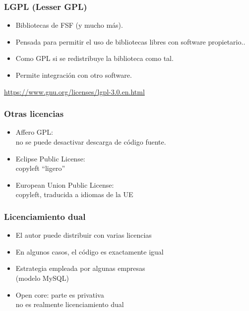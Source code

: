 \documentclass[17pt,aspectratio=169]{beamer}
\begin{document}

\begin{frame}
\frametitle{LGPL (Lesser GPL)}

\begin{itemize}
\item Bibliotecas de FSF (y mucho más).
\item Pensada para permitir el uso de bibliotecas libres con software
  propietario..
\item Como GPL si se redistribuye la biblioteca como tal.
\item Permite integración con otro software.
\end{itemize}

\begin{flushright}
  {\small
    \url{https://www.gnu.org/licenses/lgpl-3.0.en.html}
  }
\end{flushright}

\end{frame}


\begin{frame}
\frametitle{Otras licencias}

\begin{itemize}
\item Affero GPL: \\
  no se puede desactivar descarga de código fuente.
\item Eclipse Public License: \\
  copyleft ``ligero''
\item European Union Public License: \\
  copyleft, traducida a idiomas de la UE
\end{itemize}

\end{frame}


\begin{frame}
\frametitle{Licenciamiento dual}

\begin{itemize}
\item El autor puede distribuir con varias licencias
\item En algunos casos, el código es exactamente igual
\item Estrategia empleada por algunas empresas \\
  (modelo MySQL)
\item Open core: parte es privativa \\
  no es realmente licenciamiento dual
\end{itemize}

\end{frame}
\end{document}
